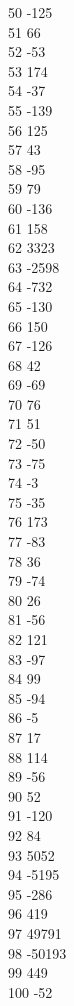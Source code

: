 { 50	-125 \\
 51	66 \\
 52	-53 \\
 53	174 \\
 54	-37 \\
 55	-139 \\
 56	125 \\
 57	43 \\
 58	-95 \\
 59	79 \\
 60	-136 \\
 61	158 \\
 62	3323 \\
 63	-2598 \\
 64	-732 \\
 65	-130 \\
 66	150 \\
 67	-126 \\
 68	42 \\
 69	-69 \\
 70	76 \\
 71	51 \\
 72	-50 \\
 73	-75 \\
 74	-3 \\
 75	-35 \\
 76	173 \\
 77	-83 \\
 78	36 \\
 79	-74 \\
 80	26 \\
 81	-56 \\
 82	121 \\
 83	-97 \\
 84	99 \\
 85	-94 \\
 86	-5 \\
 87	17 \\
 88	114 \\
 89	-56 \\
 90	52 \\
 91	-120 \\
 92	84 \\
 93	5052 \\
 94	-5195 \\
 95	-286 \\
 96	419 \\
 97	49791 \\
 98	-50193 \\
 99	449 \\
 100	-52 \\
}
